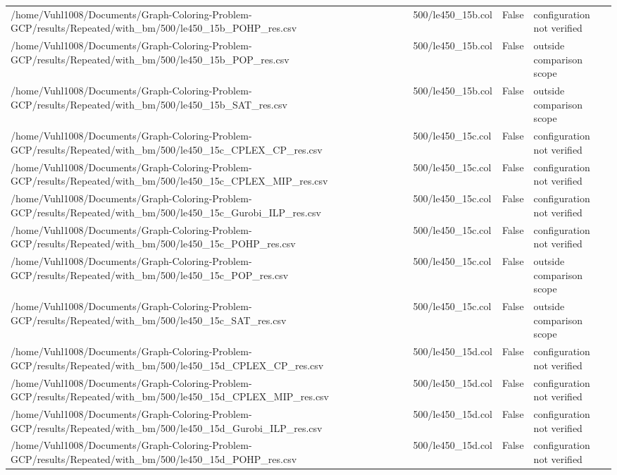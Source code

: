 \begin{table}[htbp]
\begin{tabular}{llll}
/home/Vuhl1008/Documents/Graph-Coloring-Problem-GCP/results/Repeated/with\_bm/500/le450\_15b\_POHP\_res.csv & 500/le450\_15b.col & False & configuration not verified \\
/home/Vuhl1008/Documents/Graph-Coloring-Problem-GCP/results/Repeated/with\_bm/500/le450\_15b\_POP\_res.csv & 500/le450\_15b.col & False & outside comparison scope \\
/home/Vuhl1008/Documents/Graph-Coloring-Problem-GCP/results/Repeated/with\_bm/500/le450\_15b\_SAT\_res.csv & 500/le450\_15b.col & False & outside comparison scope \\
/home/Vuhl1008/Documents/Graph-Coloring-Problem-GCP/results/Repeated/with\_bm/500/le450\_15c\_CPLEX\_CP\_res.csv & 500/le450\_15c.col & False & configuration not verified \\
/home/Vuhl1008/Documents/Graph-Coloring-Problem-GCP/results/Repeated/with\_bm/500/le450\_15c\_CPLEX\_MIP\_res.csv & 500/le450\_15c.col & False & configuration not verified \\
/home/Vuhl1008/Documents/Graph-Coloring-Problem-GCP/results/Repeated/with\_bm/500/le450\_15c\_Gurobi\_ILP\_res.csv & 500/le450\_15c.col & False & configuration not verified \\
/home/Vuhl1008/Documents/Graph-Coloring-Problem-GCP/results/Repeated/with\_bm/500/le450\_15c\_POHP\_res.csv & 500/le450\_15c.col & False & configuration not verified \\
/home/Vuhl1008/Documents/Graph-Coloring-Problem-GCP/results/Repeated/with\_bm/500/le450\_15c\_POP\_res.csv & 500/le450\_15c.col & False & outside comparison scope \\
/home/Vuhl1008/Documents/Graph-Coloring-Problem-GCP/results/Repeated/with\_bm/500/le450\_15c\_SAT\_res.csv & 500/le450\_15c.col & False & outside comparison scope \\
/home/Vuhl1008/Documents/Graph-Coloring-Problem-GCP/results/Repeated/with\_bm/500/le450\_15d\_CPLEX\_CP\_res.csv & 500/le450\_15d.col & False & configuration not verified \\
/home/Vuhl1008/Documents/Graph-Coloring-Problem-GCP/results/Repeated/with\_bm/500/le450\_15d\_CPLEX\_MIP\_res.csv & 500/le450\_15d.col & False & configuration not verified \\
/home/Vuhl1008/Documents/Graph-Coloring-Problem-GCP/results/Repeated/with\_bm/500/le450\_15d\_Gurobi\_ILP\_res.csv & 500/le450\_15d.col & False & configuration not verified \\
/home/Vuhl1008/Documents/Graph-Coloring-Problem-GCP/results/Repeated/with\_bm/500/le450\_15d\_POHP\_res.csv & 500/le450\_15d.col & False & configuration not verified \\

\end{tabular}
\end{table}
